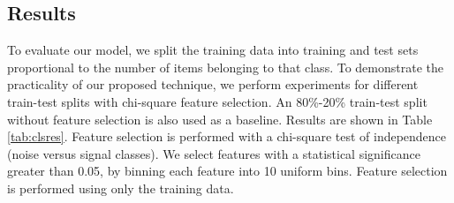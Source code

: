 {\subsection{Results}
To evaluate our model, we split the training data into training and test sets proportional to the number of items belonging to that class. To demonstrate the practicality of our proposed technique, we perform experiments for different train-test splits with chi-square feature selection. An 80\%-20\% train-test split without feature selection is also used as a baseline. Results are shown in Table \ref{tab:clsres}. Feature selection is performed with a chi-square test of independence (noise versus signal classes). We select features with a statistical significance greater than 0.05, by binning each feature into 10 uniform bins. Feature selection is performed using only the training data.

}
